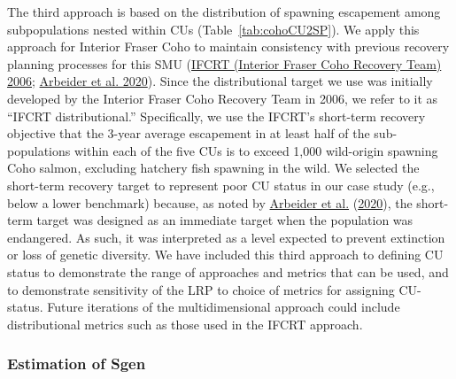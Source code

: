 \documentclass[11pt]{book}
\begin{document}
The third approach is based on the distribution of spawning escapement among subpopulations nested within CUs (Table~\ref{tab:cohoCU2SP}). We apply this approach for Interior Fraser Coho to maintain consistency with previous recovery planning processes for this SMU (\protect\hyperlink{ref-ifcrtinteriorfrasercohorecoveryteamConservationStrategyCoho2006}{IFCRT (Interior Fraser Coho Recovery Team) 2006}; \protect\hyperlink{ref-arbeiderInteriorFraserCoho2020}{Arbeider et al. 2020}). Since the distributional target we use was initially developed by the Interior Fraser Coho Recovery Team in 2006, we refer to it as ``IFCRT distributional.'' Specifically, we use the IFCRT's short-term recovery objective that the 3-year average escapement in at least half of the sub-populations within each of the five CUs is to exceed 1,000 wild-origin spawning Coho salmon, excluding hatchery fish spawning in the wild. We selected the short-term recovery target to represent poor CU status in our case study (e.g., below a lower benchmark) because, as noted by \protect\hyperlink{ref-arbeiderInteriorFraserCoho2020}{Arbeider et al.} (\protect\hyperlink{ref-arbeiderInteriorFraserCoho2020}{2020}), the short-term target was designed as an immediate target when the population was endangered. As such, it was interpreted as a level expected to prevent extinction or loss of genetic diversity. We have included this third approach to defining CU status to demonstrate the range of approaches and metrics that can be used, and to demonstrate sensitivity of the LRP to choice of metrics for assigning CU-status. Future iterations of the multidimensional approach could include distributional metrics such as those used in the IFCRT approach.

\hypertarget{cohoSgen}{%
\subsubsection{Estimation of Sgen}\label{cohoSgen}}
\end{document}
